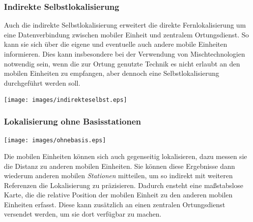 \subsubsection{Indirekte Selbstlokalisierung} 
	\begin{minipage}{\textwidth}
		\begin{minipage}[c][6cm][t]{0.6\textwidth\relax}
			Auch die indirekte Selbstlokalisierung erweitert die direkte Fernlokalisierung um eine Datenverbindung zwischen mobiler Einheit und zentralem Ortungsdienst. 
			So kann sie sich über die eigene und eventuelle auch andere mobile Einheiten informieren. 
			Dies kann insbesondere bei der Verwendung von Mischtechnologien notwendig sein, wenn die zur Ortung genutzte Technik es nicht erlaubt an den mobilen Einheiten zu empfangen, aber dennoch eine Selbstlokalisierung durchgeführt werden soll.
		\end{minipage}\hfill
		\begin{minipage}[c][6cm][c]{0.4\textwidth\relax}
			\centering
			\texttt{[image: images/indirekteselbst.eps]} 
		\end{minipage}
	\end{minipage}


\subsubsection{Lokalisierung ohne Basisstationen} 
	\begin{minipage}{\textwidth}
		\begin{minipage}[c][6cm][c]{0.4\textwidth\relax}
			\centering
			\texttt{[image: images/ohnebasis.eps]} 
		\end{minipage}\hfill
		\begin{minipage}[c][6cm][t]{0.6\textwidth\relax}
			Die mobilen Einheiten können sich auch gegenseitig lokalisieren, dazu messen sie die Distanz zu anderen mobilen Einheiten.
			Sie können diese Ergebnisse dann wiederum anderen mobilen \emph{Stationen} mitteilen, um so indirekt mit weiteren Referenzen die Lokalisierung zu präzisieren. 
			Dadurch ensteht eine maßstabslose Karte, die die relative Position der mobilen Einheit zu den anderen mobilen Einheiten erfasst.
			Diese kann zusätzlich an einen zentralen Ortungsdienst versendet werden, um sie dort verfügbar zu machen.
		\end{minipage}
	\end{minipage}


